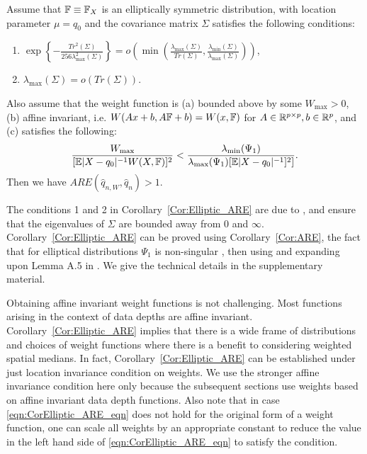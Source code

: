 \begin{Corollary}\label{Cor:Elliptic_ARE}
Assume that ${\mathbb{F}} \equiv {\mathbb{F}}_X$ is an elliptically symmetric distribution, with location parameter $\mu = q_{0}$ and the covariance matrix $\Sigma$ satisfies the following conditions:
%
\begin{enumerate}


\item $\exp \left\{ - \frac{Tr^2 (\Sigma)}{ 256 \lambda_{\max}^2 (\Sigma)} \right\} = 
o\left( \min\left( \frac{\lambda_{\max}(\Sigma) }{Tr( \Sigma)},
\frac{\lambda_{\min}(\Sigma)}{\lambda_{\max}(\Sigma)} \right) \right)$,

\item $\lambda_{\max}(\Sigma) = o( Tr(\Sigma))$.
\end{enumerate}

Also assume that the weight function is (a) bounded above by some $W_{\max} > 0$, (b) affine invariant, i.e. $ W (Ax + b, A{\mathbb{F}} + b) = W (x, {\mathbb{F}})$ for $A \in {\mathbb{R}}^{p \times p}, b \in {\mathbb{R}}^p$, and (c) satisfies the following:
%
\begin{equation}\label{eqn:CorElliptic_ARE_eqn}
\frac{W_{\max}}{[ \BE | X - q_0|^{-1} W(X, \BF)]^2 } <
\frac{\lambda_{\min} (\Psi_1)}{\lambda_{\max} (\Psi_1) [ \BE | X - q_0|^{-1}]^2]}.
\end{equation}
%
Then we have $ARE( \hat q_{n,W}, \hat q_n) > 1$.
\end{Corollary}

The conditions 1 and 2 in Corollary~\ref{Cor:Elliptic_ARE} are due to \cite{ref:JASA151658_WangPengLi}, and ensure that the eigenvalues of $\Sigma$ are bounded away from 0 and $\infty$. Corollary~\ref{Cor:Elliptic_ARE} can be proved using Corollary~\ref{Cor:ARE}, the fact that for elliptical distributions $\Psi_1$ is non-singular \cite{ref:SPL12765_Taskinenetal}, then using and expanding upon Lemma A.5 in \cite{ref:JASA151658_WangPengLi}. We give the technical details in the supplementary material.

Obtaining affine invariant weight functions is not challenging. Most functions arising in the context of data depths are affine invariant. Corollary~\ref{Cor:Elliptic_ARE} implies that there is a wide frame of distributions and  choices of weight functions where there is a benefit to considering weighted spatial medians. In fact, Corollary~\ref{Cor:Elliptic_ARE} can be established under just 
location invariance condition on weights. We use the stronger affine invariance condition
here only because the subsequent sections use weights based on affine invariant 
data depth functions. Also note that in case \eqref{eqn:CorElliptic_ARE_eqn} does not hold for the original form of a weight function, one can scale all weights by an appropriate constant to reduce the value in the left hand side of \eqref{eqn:CorElliptic_ARE_eqn} to satisfy the condition.

